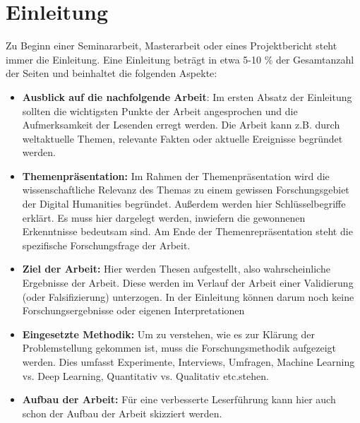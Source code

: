 \section{Einleitung}
Zu Beginn einer Seminararbeit, Masterarbeit oder eines Projektbericht steht 
immer die Einleitung. Eine Einleitung beträgt in etwa 5-10 \% der Gesamtanzahl der Seiten und beinhaltet die folgenden Aspekte:
\begin{itemize}
    \item \textbf{Ausblick auf die nachfolgende Arbeit}: Im ersten Absatz der Einleitung sollten die wichtigsten Punkte der Arbeit angesprochen und die Aufmerksamkeit der Lesenden erregt werden. Die Arbeit kann z.B. durch weltaktuelle Themen, relevante Fakten oder aktuelle Ereignisse begründet werden. 
    \item  \textbf{Themenpräsentation:} Im Rahmen der Themenpräsentation wird die wissenschaftliche Relevanz des Themas zu einem gewissen Forschungsgebiet der Digital Humanities begründet. Außerdem werden hier Schlüsselbegriffe erklärt. Es muss hier dargelegt werden, inwiefern die gewonnenen Erkenntnisse bedeutsam sind. Am Ende der Themenrepräsentation steht die spezifische Forschungsfrage der Arbeit.
    \item  \textbf{Ziel der Arbeit:} Hier werden Thesen aufgestellt, also wahrscheinliche Ergebnisse der Arbeit. Diese werden im Verlauf der Arbeit einer Validierung (oder Falsifizierung) unterzogen. In der Einleitung können darum noch keine Forschungsergebnisse oder eigenen Interpretationen 
    \item \textbf{Eingesetzte Methodik:} Um zu verstehen, wie es zur Klärung der Problemstellung gekommen ist, muss die Forschungsmethodik aufgezeigt werden. Dies umfasst Experimente, Interviews, Umfragen, Machine Learning vs. Deep Learning, Quantitativ vs. Qualitativ etc.stehen.
    \item  \textbf{Aufbau der Arbeit:} Für eine verbesserte Leserführung kann hier auch  schon der Aufbau der Arbeit skizziert werden.
\end{itemize}